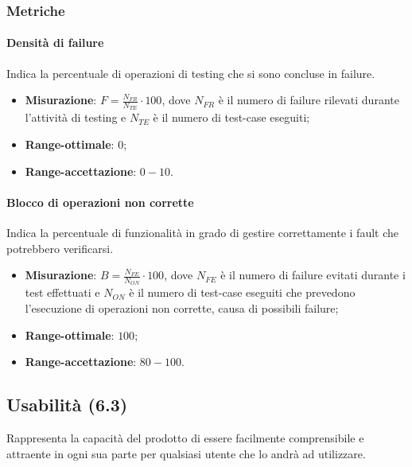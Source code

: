 \subsubsection{Metriche}
\paragraph{Densità di failure}
Indica la percentuale di operazioni di testing che si sono concluse in failure.
\begin{itemize}
\item \textbf{Misurazione}: $F=\frac{N_{FR}}{N_{TE}} \cdot 100$, dove $N_{FR}$ è il numero di failure rilevati durante l'attività di testing e $N_{TE}$ è il numero di test-case eseguiti;
\item \textbf{Range-ottimale}: $0$;
\item \textbf{Range-accettazione}: $0 - 10$.
\end{itemize}
\paragraph{Blocco di operazioni non corrette}
Indica la percentuale di funzionalità in grado di gestire correttamente i fault che potrebbero verificarsi.
\begin{itemize}
\item \textbf{Misurazione}: $B=\frac{N_{FE}}{N_{ON}} \cdot 100$, dove $N_{FE}$ è il numero di failure evitati durante i test effettuati e $N_{ON}$ è il numero di test-case eseguiti che prevedono l'esecuzione di operazioni non corrette, causa di possibili failure;
\item \textbf{Range-ottimale}: $100$;
\item \textbf{Range-accettazione}: $80 - 100$.
\end{itemize}

\subsection{Usabilità (6.3)}
Rappresenta la capacità del prodotto di essere facilmente comprensibile e attraente in ogni sua parte per qualsiasi utente che lo andrà ad utilizzare.
